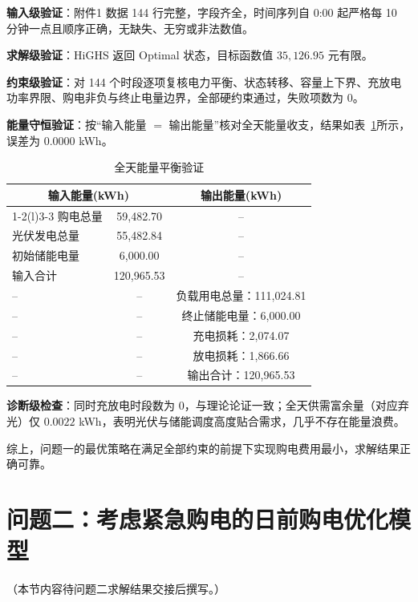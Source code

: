 \documentclass[zihao=-4,a4paper,UTF8,fontset=none]{ctexart}
\begin{document}
\textbf{输入级验证}：附件1 数据 144 行完整，字段齐全，时间序列自 0:00 起严格每 10 分钟一点且顺序正确，无缺失、无穷或非法数值。

\textbf{求解级验证}：HiGHS 返回 Optimal 状态，目标函数值 $35{,}126.95$ 元有限。

\textbf{约束级验证}：对 144 个时段逐项复核电力平衡、状态转移、容量上下界、充放电功率界限、购电非负与终止电量边界，全部硬约束通过，失败项数为 0。

\textbf{能量守恒验证}：按“输入能量 $=$ 输出能量”核对全天能量收支，结果如表~\ref{tab:energy}所示，误差为 $0.0000$ kWh。

\begin{table}[H]
  \centering
  \caption{全天能量平衡验证}
  \label{tab:energy}
  \begin{tabular}{lcc}
    \toprule
    \multicolumn{2}{c}{输入能量(kWh)} & \multicolumn{1}{c}{输出能量(kWh)} \\
    \cmidrule(r){1-2}\cmidrule(l){3-3}
    购电总量 & 59,482.70 & -- \\
    光伏发电总量 & 55,482.84 & -- \\
    初始储能电量 & 6,000.00 & -- \\
    \midrule
    输入合计 & 120,965.53 & -- \\
    \midrule
    -- & -- & 负载用电总量：111,024.81 \\
    -- & -- & 终止储能电量：6,000.00 \\
    -- & -- & 充电损耗：2,074.07 \\
    -- & -- & 放电损耗：1,866.66 \\
    \midrule
    -- & -- & 输出合计：120,965.53 \\
    \bottomrule
  \end{tabular}
\end{table}

\textbf{诊断级检查}：同时充放电时段数为 0，与理论论证一致；全天供需富余量（对应弃光）仅 $0.0022$ kWh，表明光伏与储能调度高度贴合需求，几乎不存在能量浪费。

综上，问题一的最优策略在满足全部约束的前提下实现购电费用最小，求解结果正确可靠。

\section{问题二：考虑紧急购电的日前购电优化模型}

（本节内容待问题二求解结果交接后撰写。）
\end{document}
